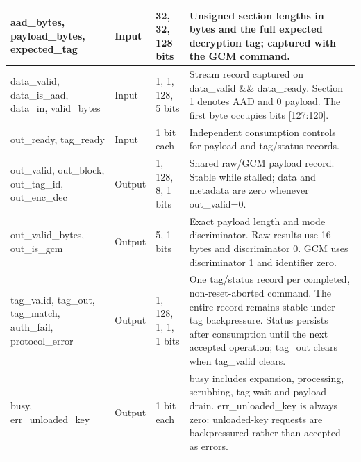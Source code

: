 \documentclass[11pt,a4paper]{article}
\begin{document}
{\begin{longtable}{@{}L{0.21\textwidth}|L{0.12\textwidth}|L{0.12\textwidth}|L{0.45\textwidth}@{}}
aad\_\allowbreak{}bytes,\allowbreak{} payload\_\allowbreak{}bytes,\allowbreak{} expected\_\allowbreak{}tag & Input & 32,\allowbreak{} 32,\allowbreak{} 128 bits & Unsigned section lengths in bytes and the full expected decryption tag; captured with the GCM command.\\[2pt]\hline

data\_\allowbreak{}valid,\allowbreak{} data\_\allowbreak{}is\_\allowbreak{}aad,\allowbreak{} data\_\allowbreak{}in,\allowbreak{} valid\_\allowbreak{}bytes & Input & 1,\allowbreak{} 1,\allowbreak{} 128,\allowbreak{} 5 bits & Stream record captured on data\_\allowbreak{}valid \&\& data\_\allowbreak{}ready. Section 1 denotes AAD and 0 payload. The first byte occupies bits [\allowbreak{}127:120]\allowbreak{}.\\[2pt]\hline

out\_\allowbreak{}ready,\allowbreak{} tag\_\allowbreak{}ready & Input & 1 bit each & Independent consumption controls for payload and tag/\allowbreak{}status records.\\[2pt]\hline

out\_\allowbreak{}valid,\allowbreak{} out\_\allowbreak{}block,\allowbreak{} out\_\allowbreak{}tag\_\allowbreak{}id,\allowbreak{} out\_\allowbreak{}enc\_\allowbreak{}dec & Output & 1,\allowbreak{} 128,\allowbreak{} 8,\allowbreak{} 1 bits & Shared raw/\allowbreak{}GCM payload record. Stable while stalled; data and metadata are zero whenever out\_\allowbreak{}valid=\allowbreak{}0.\\[2pt]\hline

out\_\allowbreak{}valid\_\allowbreak{}bytes,\allowbreak{} out\_\allowbreak{}is\_\allowbreak{}gcm & Output & 5,\allowbreak{} 1 bits & Exact payload length and mode discriminator. Raw results use 16 bytes and discriminator 0. GCM uses discriminator 1 and identifier zero.\\[2pt]\hline

tag\_\allowbreak{}valid,\allowbreak{} tag\_\allowbreak{}out,\allowbreak{} tag\_\allowbreak{}match,\allowbreak{} auth\_\allowbreak{}fail,\allowbreak{} protocol\_\allowbreak{}error & Output & 1,\allowbreak{} 128,\allowbreak{} 1,\allowbreak{} 1,\allowbreak{} 1 bits & One tag/\allowbreak{}status record per completed,\allowbreak{} non-reset-aborted command. The entire record remains stable under tag backpressure. Status persists after consumption until the next accepted operation; tag\_\allowbreak{}out clears when tag\_\allowbreak{}valid clears.\\[2pt]\hline

busy,\allowbreak{} err\_\allowbreak{}unloaded\_\allowbreak{}key & Output & 1 bit each & busy includes expansion,\allowbreak{} processing,\allowbreak{} scrubbing,\allowbreak{} tag wait and payload drain. err\_\allowbreak{}unloaded\_\allowbreak{}key is always zero: unloaded-key requests are backpressured rather than accepted as errors.\\[2pt]\hline

\bottomrule\end{longtable}}
\end{document}
